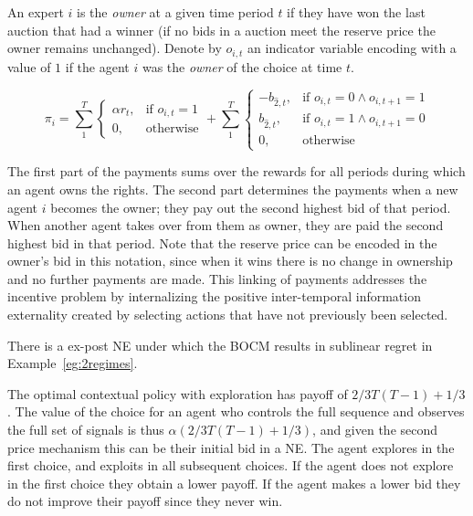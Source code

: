 \begin{mech}
An expert $i$ is the \emph{owner} at a given time period $t$ if they have won the last auction that had a winner (if no bids in a auction meet the reserve price the owner remains unchanged). 
Denote by $o_{i,t}$ an indicator variable encoding with a value of $1$ if the agent $i$ was the \emph{owner} of the choice at time $t$. 

\[
    \pi_i =  \sum_1^T
\begin{cases}
    \alpha r_t ,& \text{if } o_{i,t} = 1\\
    0,              & \text{otherwise}
\end{cases}
+
\sum_1^T
\begin{cases}
     - b_{\hat{2},t} ,& \text{if } o_{i,t} = 0 \land o_{i,t+1} = 1\\
      b_{\hat{2},t} ,& \text{if } o_{i,t}= 1 \land o_{i,t+1} = 0 \\
		0,              & \text{otherwise}
\end{cases}
\]

\end{mech}


The first part of the payments sums over the rewards for all periods during which an agent owns the rights.
The second part determines the payments when a new agent $i$ becomes the owner; they pay out the second highest bid of that period. 
When another agent takes over from them as owner, they are paid the second highest bid in that period.
Note that the reserve price can be encoded in the owner's bid in this notation, since when it wins there is no change in ownership and no further payments are made. 
This linking of payments addresses the incentive problem by internalizing the positive inter-temporal information externality created by selecting actions that have not previously been selected.


\begin{prop}
There is a ex-post NE under which the BOCM  results in sublinear regret in Example~\ref{eg:2regimes}. 
\end{prop}


The optimal contextual policy with exploration has payoff of $2/3T(T-1) + 1/3$. The value of the choice for an agent who controls the full sequence and observes the full set of signals is thus $\alpha (2/3T(T-1) + 1/3)$, and given the second price mechanism this can be their initial bid in a NE.
The agent explores in the first choice, and exploits in all subsequent choices. If the agent does not explore in the first choice they obtain a lower payoff. If the agent makes a lower bid they do not improve their payoff since they never win.


